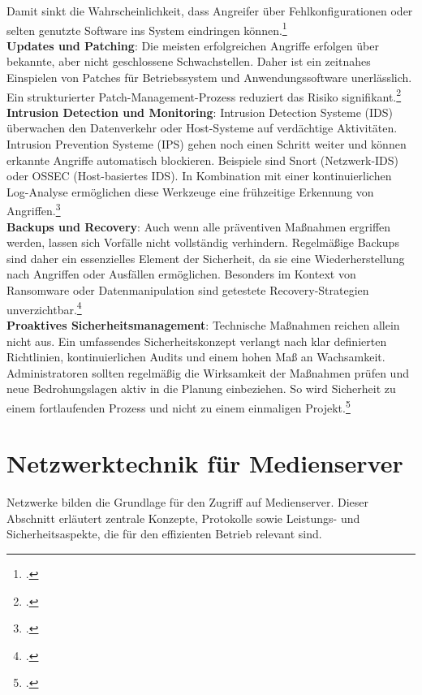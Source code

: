 \documentclass[12pt,a4paper]{report}
\begin{document}
  Damit sinkt die Wahrscheinlichkeit, dass Angreifer über Fehlkonfigurationen oder selten genutzte Software ins System eindringen können.\footcite[Vgl.][S.~902]{nemeth_unixlinux}
  \\  
  \newline
  \textbf{Updates und Patching}:  
  Die meisten erfolgreichen Angriffe erfolgen über bekannte, aber nicht geschlossene Schwachstellen. 
  Daher ist ein zeitnahes Einspielen von Patches für Betriebssystem und Anwendungssoftware unerlässlich. 
  Ein strukturierter Patch-Management-Prozess reduziert das Risiko signifikant.\footcite[Vgl.][S.~901]{nemeth_unixlinux}  
  \\
  \newline
  \textbf{Intrusion Detection und Monitoring}:  
  Intrusion Detection Systeme (IDS) überwachen den Datenverkehr oder Host-Systeme auf verdächtige Aktivitäten. 
  Intrusion Prevention Systeme (IPS) gehen noch einen Schritt weiter und können erkannte Angriffe automatisch blockieren. 
  Beispiele sind Snort (Netzwerk-IDS) oder OSSEC (Host-basiertes IDS). 
  In Kombination mit einer kontinuierlichen Log-Analyse ermöglichen diese Werkzeuge eine frühzeitige Erkennung von Angriffen.\footcite[Vgl.][S.~918~ff.]{nemeth_unixlinux} 
  \\ 
  \newline
  \textbf{Backups und Recovery}:  
  Auch wenn alle präventiven Maßnahmen ergriffen werden, lassen sich Vorfälle nicht vollständig verhindern. 
  Regelmäßige Backups sind daher ein essenzielles Element der Sicherheit, da sie eine Wiederherstellung nach Angriffen oder Ausfällen ermöglichen. 
  Besonders im Kontext von Ransomware oder Datenmanipulation sind getestete Recovery-Strategien unverzichtbar.\footcite[Vgl.][S.~903]{nemeth_unixlinux} 
  \\ 
  \newline
  \textbf{Proaktives Sicherheitsmanagement}:  
  Technische Maßnahmen reichen allein nicht aus. 
  Ein umfassendes Sicherheitskonzept verlangt nach klar definierten Richtlinien, kontinuierlichen Audits und einem hohen Maß an Wachsamkeit. 
  Administratoren sollten regelmäßig die Wirksamkeit der Maßnahmen prüfen und neue Bedrohungslagen aktiv in die Planung einbeziehen. 
  So wird Sicherheit zu einem fortlaufenden Prozess und nicht zu einem einmaligen Projekt.\footcite[Vgl.][S.~901, S.~905]{nemeth_unixlinux}  

\section{Netzwerktechnik für Medienserver}
Netzwerke bilden die Grundlage für den Zugriff auf Medienserver. 
Dieser Abschnitt erläutert zentrale Konzepte, Protokolle sowie Leistungs- und Sicherheitsaspekte, 
die für den effizienten Betrieb relevant sind.  
\end{document}

